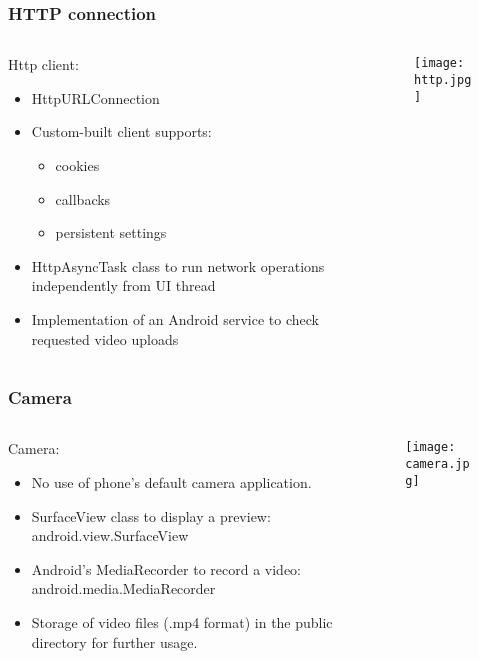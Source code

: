 \begin{frame}	
	\frametitle{HTTP connection}
	\begin{columns}[t]
		\begin{column}[t]{0.5\linewidth}
			Http client:
			\begin{itemize}
				\item HttpURLConnection
				\item Custom-built client supports:
				\begin{itemize}
					\item cookies
					\item callbacks
					\item persistent settings					
				\end{itemize} 
				\item HttpAsyncTask class to run network operations independently from UI thread
				\item Implementation of an Android service to check requested video uploads
			\end{itemize}
		\end{column}
		\begin{column}[t]{0.5\linewidth}
			\begin{figure}[!t]
				\centering
				\texttt{[image: http.jpg]}
				\label{fig:http}
			\end{figure}
			
		\end{column}		
	\end{columns}	
\end{frame}

\begin{frame}	
	\frametitle{Camera}
	\begin{columns}[t]
		\begin{column}[t]{0.5\linewidth}
			Camera:
			\begin{itemize}
				\item No use of phone's default camera application.
				\item SurfaceView class to display a preview: android.view.SurfaceView
				\item Android's MediaRecorder to record a video: android.media.MediaRecorder
				\item Storage of video files (.mp4 format) in the public directory for further usage. 
			\end{itemize}
		\end{column}
		\begin{column}[t]{0.5\linewidth}
			\begin{figure}[!t]
				\centering
				\texttt{[image: camera.jpg]}
				\label{fig:camera}
			\end{figure}
			
		\end{column}		
	\end{columns}	
\end{frame}

